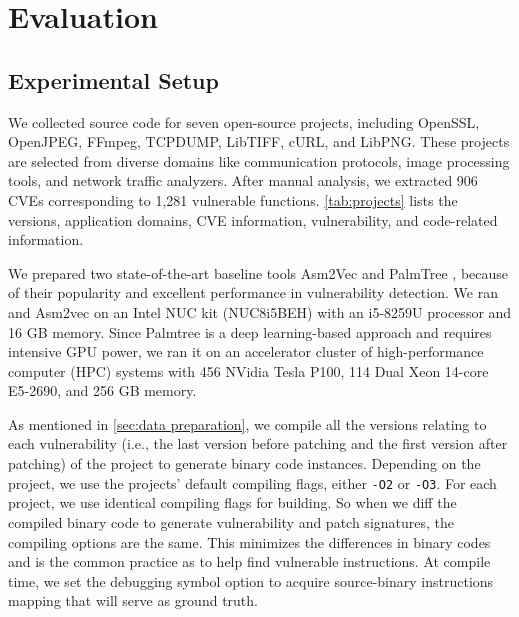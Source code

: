 \section{Evaluation}
\label{sec:eval}



\subsection{Experimental Setup}

We collected source code for seven open-source projects, including OpenSSL, OpenJPEG, FFmpeg, TCPDUMP, LibTIFF, cURL, and LibPNG. 
These projects are selected from diverse domains like communication protocols, image processing tools, and network traffic analyzers.
After manual analysis, we extracted 906 CVEs corresponding to 1,281 vulnerable functions.
\autoref{tab:projects} lists the versions, application domains, CVE information, vulnerability, and code-related information.


We prepared two state-of-the-art baseline tools Asm2Vec \cite{asm2vec} and PalmTree \cite{Palmtree}, because of their popularity and excellent performance in vulnerability detection.  
We ran \name and Asm2vec on an Intel NUC kit (NUC8i5BEH) with an i5-8259U processor and 16 GB memory. 
Since Palmtree is a deep learning-based approach and requires intensive GPU power, we ran it on an accelerator cluster of high-performance computer (HPC) systems with 456 NVidia Tesla P100, 114 Dual Xeon 14-core E5-2690, and 256 GB memory.


As mentioned in \autoref{sec:data preparation}, we compile all the versions relating to each vulnerability (i.e., the last version before patching and the first version after patching) of the project to generate binary code instances. 
Depending on the project, we use the projects' default compiling flags, either \texttt{-O2} or \texttt{-O3}. 
For each project, we use identical compiling flags for building. 
So when we diff the compiled binary code to generate vulnerability and patch signatures, the compiling options are the same. This minimizes the differences in binary codes and is the common practice as \cite{binxray, viva} to help find vulnerable instructions. 
At compile time, we set the debugging symbol option to acquire source-binary instructions mapping that will serve as ground truth.


